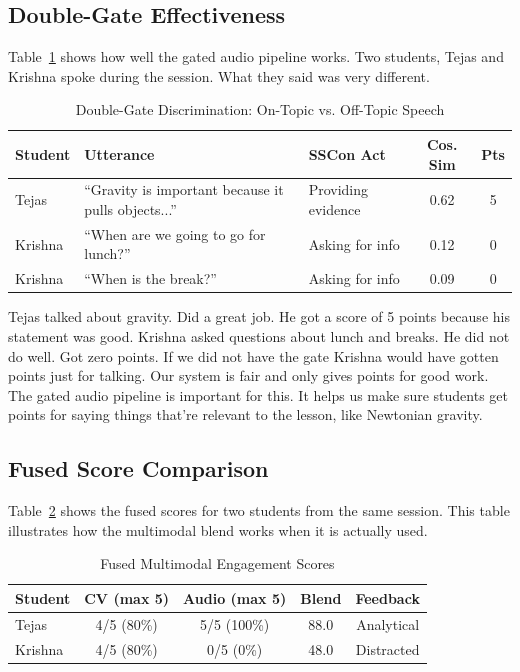 \documentclass[conference]{IEEEtran}
\begin{document}
\subsection{Double-Gate Effectiveness}
Table~\ref{tab:gate_demo} shows how well the gated audio pipeline works. Two students, Tejas and Krishna spoke during the session. What they said was very different.
\begin{table}[htbp]
\caption{Double-Gate Discrimination: On-Topic vs. Off-Topic Speech}
\begin{center}
\setlength{\tabcolsep}{3pt}
\begin{tabular}{|p{1.05cm}|p{1.95cm}|p{1.4cm}|c|c|}
\hline
\textbf{Student} & \textbf{Utterance} & \textbf{SSCon Act} & \textbf{Cos. Sim} & \textbf{Pts} \\
\hline
Tejas & ``Gravity is important because it pulls objects...'' & Providing evidence & 0.62 & 5 \\
\hline
Krishna & ``When are we going to go for lunch?'' & Asking for info & 0.12 & 0 \\
\hline
Krishna & ``When is the break?'' & Asking for info & 0.09 & 0 \\
\hline
\end{tabular}
\label{tab:gate_demo}
\end{center}
\end{table}

Tejas talked about gravity. Did a great job. He got a score of 5 points because his statement was good. Krishna asked questions about lunch and breaks. He did not do well. Got zero points. If we did not have the gate Krishna would have gotten points just for talking. Our system is fair and only gives points for good work. The gated audio pipeline is important for this. It helps us make sure students get points for saying things that're relevant to the lesson, like Newtonian gravity.
\subsection{Fused Score Comparison}
Table~\ref{tab:fused} shows the fused scores for two students from the same session. This table illustrates how the multimodal blend works when it is actually used.

\begin{table}[htbp]
\caption{Fused Multimodal Engagement Scores}
\begin{center}
\begin{tabular}{|l|c|c|c|c|}
\hline
\textbf{Student} & \textbf{CV (max 5)} & \textbf{Audio (max 5)} & \textbf{Blend} & \textbf{Feedback} \\
\hline
Tejas & 4/5 (80\%) & 5/5 (100\%) & 88.0 & Analytical \\
\hline
Krishna & 4/5 (80\%) & 0/5 (0\%) & 48.0 & Distracted \\
\hline
\end{tabular}
\label{tab:fused}
\end{center}
\end{table}
\end{document}
